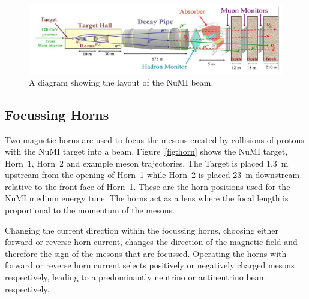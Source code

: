 
\begin{figure}
  \centering
  \includegraphics[width=1\textwidth]{../../img/beam/beam_diagram.png} 
  \caption{A diagram showing the layout of the NuMI beam.  }
  \label{fig:NuMI}
\end{figure}

\subsection{Focussing Horns}

Two magnetic horns are used to focus the mesons created 
by collisions of protons with the NuMI target into a
beam. Figure~\ref{fig:horn} shows the NuMI target, Horn~1, Horn~2 and
example meson trajectories. 
The Target is placed 1.3~m upstream from the opening of Horn~1 while
Horn~2 is placed 23~m downstream relative to the front face of Horn~1.
These are the horn positions used for the NuMI medium energy tune. 
The horns act as a lens where the focal
length is proportional to the momentum of the mesons.

Changing the current
direction within the focussing horns, choosing either forward or
reverse horn current, changes the direction of
the magnetic field and therefore the sign
of the mesons that are focussed. Operating the horns with forward or
reverse horn current selects positively or negatively charged mesons
respectively, leading to a predominantly neutrino or antineutrino beam
respectively. 




